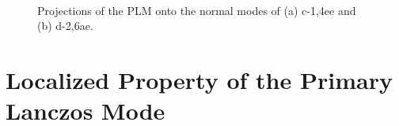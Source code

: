 \begin{figure}[!h]
\\
\caption{Projections of the PLM onto the normal modes of (a) c-1,4ee and (b) d-2,6ae.\label{LancProj}}
\end{figure}



\section{Localized Property of the Primary Lanczos Mode}

